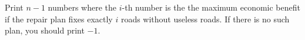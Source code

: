 Print $n-1$ numbers where the $i$-th number is the
the maximum economic benefit if the repair plan fixes 
exactly $i$ roads without useless roads.
If there is no such plan, you should print $-1$.
